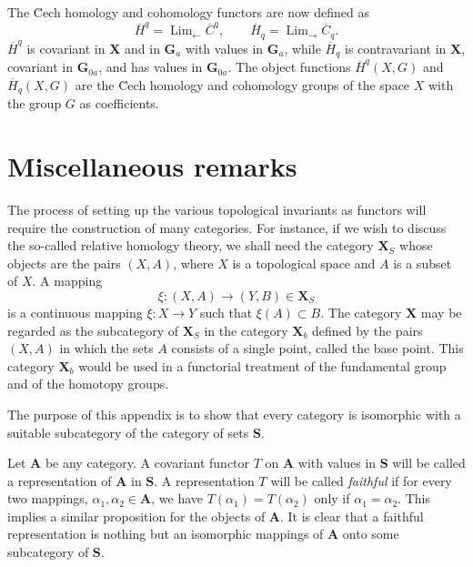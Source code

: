 \documentclass[11pt,a4paper]{report}
\DeclareMathOperator{\Lim}{Lim}
\begin{document}
The \u{C}ech homology and cohomology functors are now defined as
\begin{equation*}
	\overline{H}^q=\Lim_{\leftarrow}\overline{C}^q,\qquad \overline{H}_q=\Lim_{\rightarrow}\overline{C}_q.
\end{equation*}
$\overline{H}^q$ is covariant in $\mathbf{X}$ and in $\mathbf{G}_a$ with values in $\mathbf{G}_a$, while $\overline{H}_q$
is contravariant in $\mathbf{X}$, covariant in $\mathbf{G}_{0a}$, and has values in $\mathbf{G}_{0a}$. The object functions
$\overline{H}^q(X,G)$ and $\overline{H}_q(X,G)$ are the \u{C}ech homology and cohomology groups of the space $X$ with the
group $G$ as coefficients.

\section{Miscellaneous remarks}\label{sec:misc}
The process of setting up the various topological invariants as functors will require the construction of many categories.
For instance, if we wish to discuss the so\hyp{}called relative homology theory, we shall need the category $\mathbf{X}_S$
whose objects are the pairs $(X,A)$, where $X$ is a topological space and $A$ is a subset of $X$. A mapping
\begin{equation*}
	\xi:(X,A)\rightarrow (Y,B)\in\mathbf{X}_S
\end{equation*}
is a continuous mapping $\xi:X\rightarrow Y$ such that $\xi(A)\subset B$. The category $\mathbf{X}$ may be regarded
as the subcategory of $\mathbf{X}_S$ in the category $\mathbf{X}_b$ defined by the pairs $(X,A)$ in which the sets $A$
consists of a single point, called the base point. This category $\mathbf{X}_b$ would be used in a functorial
treatment of the fundamental group and of the homotopy groups.

\label{sec:rep-cat}
The purpose of this appendix is to show that every category is isomorphic with a suitable subcategory of the
category of sets $\mathbf{S}$.

Let $\mathbf{A}$ be any category. A covariant functor $T$ on $\mathbf{A}$ with values in $\mathbf{S}$ will be
called a representation of $\mathbf{A}$ in $\mathbf{S}$. A representation $T$ will be called \emph{faithful}
if for every two mappings, $\alpha_1,\alpha_2\in\mathbf{A}$, we have $T(\alpha_1)=T(\alpha_2)$ only if
$\alpha_1=\alpha_2$. This implies a similar proposition for the objects of $\mathbf{A}$. It is clear that a
faithful representation is nothing but an isomorphic mappings of $\mathbf{A}$ onto some subcategory of $\mathbf{S}$.
\end{document}
